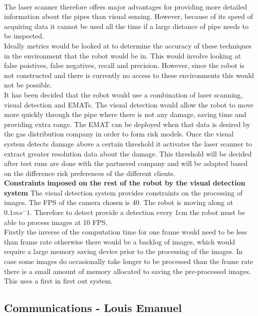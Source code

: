 \documentclass[11pt]{article}		%
\begin{document}
        \\
        The laser scanner therefore offers major advantages for providing more detailed information about the pipes than visual sensing. 
        However, because of its speed of acquiring data it cannot be used all the time if a large distance of pipe needs to be inspected.
        \\
        Ideally metrics would be looked at to determine the accuracy of these techniques in the environment that the robot would be in. 
        This would involve looking at false poistives, false negatives, recall and precision.
        However, since the robot is not constructed and there is currently no access to these environments this would not be possible.
        \\
        It has been decided that the robot would use a combination of laser scanning, visual detection and EMATs.
        The visual detection would allow the robot to move more quickly through the pipe where there is not any damage, saving time and providing extra range. 
        The EMAT can be deployed when that data is desired by the gas distribution company in order to form risk models. 
        Once the visual system detects damage  above a certain threshold it activates the laser scanner to extract greater resolution data about the damage. 
        This threshold will be decided after test runs are done with the partnered company and will be adapted based on the difference risk preferences of the different clients.
    	\\
        \textbf{Constraints imposed on the rest of the robot by the visual detection system}
        The visual detection system provides constraints on the processing of images. The FPS of the camera chosen is 40.
        The robot is moving along at $0.1ms^-1$. 
        Therefore to detect provide a detection every 1cm the robot must be able to process images at 10 FPS.
        \\
        Firstly the inverse of the computation time for one frame would need to be less than frame rate otherwise there would be a backlog of images, which would require a large memory saving device prior to the processing of the images. 
        In case some images do occasionally take longer to be processed than the frame rate there is a small amount of memory allocated to saving the pre-processed images. 
        This uses a first in first out system.

		\subsection[Communications]{Communications - Louis Emanuel}
\end{document}
